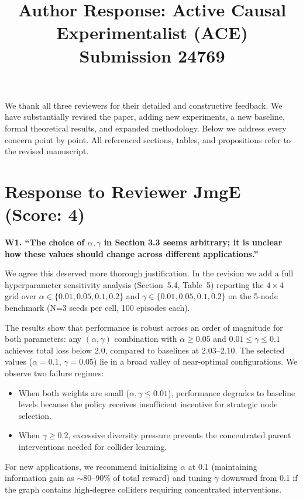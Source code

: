 \documentclass[11pt]{article}
\title{Author Response: Active Causal Experimentalist (ACE)\\Submission 24769}
\author{}
\date{}
\newcommand{\reviewer}[1]{\vspace{0.8em}\noindent\textbf{\textcolor{reviewercolor}{#1}}}
\newcommand{\response}{\vspace{0.3em}\noindent\textcolor{responsecolor}}
\begin{document}
\maketitle
\thispagestyle{empty}

\noindent We thank all three reviewers for their detailed and constructive feedback. We have substantially revised the paper, adding new experiments, a new baseline, formal theoretical results, and expanded methodology. Below we address every concern point by point. All referenced sections, tables, and propositions refer to the revised manuscript.

\section{Response to Reviewer JmgE (Score: 4)}

\reviewer{W1. ``The choice of $\alpha, \gamma$ in Section 3.3 seems arbitrary; it is unclear how these values should change across different applications.''}

\response We agree this deserved more thorough justification. In the revision we add a full hyperparameter sensitivity analysis (Section~5.4, Table~5) reporting the $4 \times 4$ grid over $\alpha \in \{0.01, 0.05, 0.1, 0.2\}$ and $\gamma \in \{0.01, 0.05, 0.1, 0.2\}$ on the 5-node benchmark (N=3 seeds per cell, 100 episodes each).

The results show that performance is robust across an order of magnitude for both parameters: any $(\alpha, \gamma)$ combination with $\alpha \geq 0.05$ and $0.01 \leq \gamma \leq 0.1$ achieves total loss below 2.0, compared to baselines at 2.03--2.10. The selected values ($\alpha = 0.1$, $\gamma = 0.05$) lie in a broad valley of near-optimal configurations. We observe two failure regimes:
\begin{itemize}[nosep]
\item When both weights are small ($\alpha, \gamma \leq 0.01$), performance degrades to baseline levels because the policy receives insufficient incentive for strategic node selection.
\item When $\gamma \geq 0.2$, excessive diversity pressure prevents the concentrated parent interventions needed for collider learning.
\end{itemize}

For new applications, we recommend initializing $\alpha$ at 0.1 (maintaining information gain as $\sim$80--90\% of total reward) and tuning $\gamma$ downward from 0.1 if the graph contains high-degree colliders requiring concentrated interventions.
\end{document}
